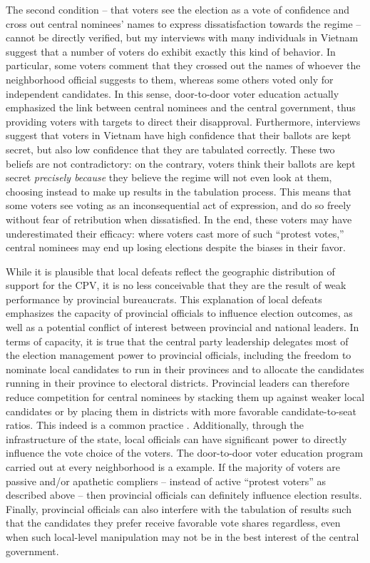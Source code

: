 \documentclass[12pt]{article}\usepackage[]{graphicx}\usepackage[]{color}
\newcommand{\1}{\mathbbm{1}}
\begin{document}
The second condition -- that voters see the election as a vote of confidence and cross out central nominees' names to express dissatisfaction towards the regime -- cannot be directly verified, but my interviews with many individuals in Vietnam suggest that a number of voters do exhibit exactly this kind of behavior. In particular, some voters comment that they crossed out the names of whoever the neighborhood official suggests to them, whereas some others voted only for independent candidates. In this sense, door-to-door voter education actually emphasized the link between central nominees and the central government, thus providing voters with targets to direct their disapproval. Furthermore, interviews suggest that voters in Vietnam have high confidence that their ballots are kept secret, but also low confidence that they are tabulated correctly. These two beliefs are not contradictory: on the contrary, voters think their ballots are kept secret \textit{precisely because} they believe the regime will not even look at them, choosing instead to make up results in the tabulation process. This means that some voters see voting as an inconsequential act of expression, and do so freely without fear of retribution when dissatisfied. In the end, these voters may have underestimated their efficacy: where voters cast more of such ``protest votes,'' central nominees may end up losing elections despite the biases in their favor.

While it is plausible that local defeats reflect the geographic distribution of support for the CPV, it is no less conceivable that they are the result of weak performance by provincial bureaucrats. This explanation of local defeats emphasizes the capacity of provincial officials to influence election outcomes, as well as a potential conflict of interest between provincial and national leaders. In terms of capacity, it is true that the central party leadership delegates most of the election management power to provincial officials, including the freedom to nominate local candidates to run in their provinces and to allocate the candidates running in their province to electoral districts. Provincial leaders can therefore reduce competition for central nominees by stacking them up against weaker local candidates or by placing them in districts with more favorable candidate-to-seat ratios. This indeed is a common practice \cite[provided confirmatory evidence for the 2007 election, which I replicated successfully for the 2011 and 2016 elections]{MaleskySchuler2011}.  Additionally, through the infrastructure of the state, local officials can have significant power to directly influence the vote choice of the voters. The door-to-door voter education program carried out at every neighborhood is a example. If the majority of voters are passive and/or apathetic compliers -- instead of active ``protest voters'' as described above -- then provincial officials can definitely influence election results. Finally, provincial officials can also interfere with the tabulation of results such that the candidates they prefer receive favorable vote shares regardless, even when such local-level manipulation may not be in the best interest of the central government. 
\end{document}
